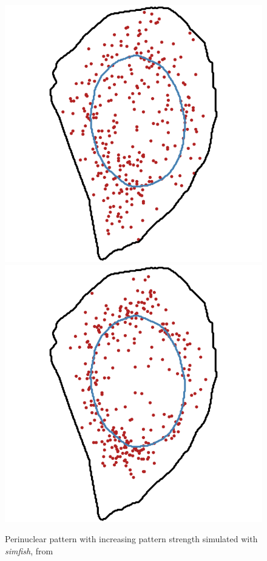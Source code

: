 \begin{figure}[]
		\includegraphics[width=\linewidth]{figures/chapter4/simulation_perinuclear_50}
	\endminipage\hfill
		\includegraphics[width=\linewidth]{figures/chapter4/simulation_perinuclear_90}
	\endminipage
	\caption[Simulated perinuclear patterns]{Perinuclear pattern with increasing pattern strength simulated with \emph{simfish}, from~\cite{pointfish_2022}}
	\label{fig:perinuclear_panel}
\end{figure}

